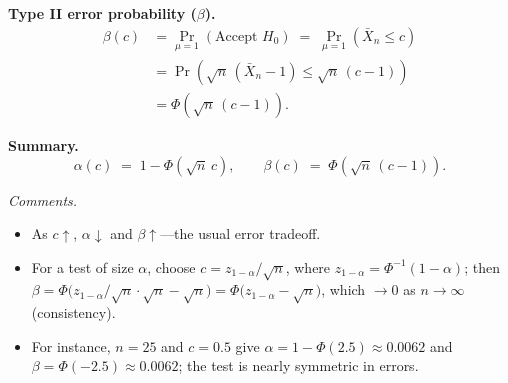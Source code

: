 \documentclass[11pt]{article}
\begin{document}
\textbf{Type II error probability ($\beta$).}
\begin{align*}
\beta(c) &= \Pr_{\mu=1}(\text{Accept } H_0) \;=\; \Pr_{\mu=1}(\bar X_n \le c) \\
&= \Pr\!\left(\sqrt{n}\,(\bar X_n - 1) \le \sqrt{n}\,(c-1)\right) \\
&= \Phi\!\left(\sqrt{n}\,(c-1)\right).
\end{align*}

\textbf{Summary.}
\[
\boxed{\;\alpha(c) \;=\; 1-\Phi(\sqrt{n}\,c), \qquad \beta(c) \;=\; \Phi\!\left(\sqrt{n}\,(c-1)\right).\;}
\]

\textit{Comments.}
\begin{itemize}
\item As $c\uparrow$, $\alpha\downarrow$ and $\beta\uparrow$---the usual error tradeoff.
\item For a test of size $\alpha$, choose $c = z_{1-\alpha}/\sqrt{n}$, where $z_{1-\alpha}=\Phi^{-1}(1-\alpha)$; then $\beta = \Phi\!\big(z_{1-\alpha}/\sqrt{n}\cdot\sqrt{n} - \sqrt{n}\big) = \Phi\!\big(z_{1-\alpha}-\sqrt{n}\big)$, which $\to 0$ as $n\to\infty$ (consistency).
\item For instance, $n=25$ and $c=0.5$ give $\alpha = 1-\Phi(2.5)\approx 0.0062$ and $\beta = \Phi(-2.5)\approx 0.0062$; the test is nearly symmetric in errors.
\end{itemize}
\end{document}
